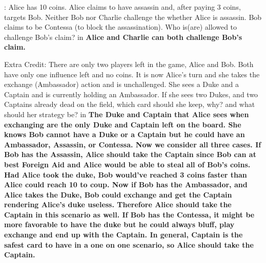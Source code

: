 \documentclass[11.5pt]{article}
\begin{document}
\vskip 0.16in

: Alice has 10 coins. Alice claims to have assassin and, after paying 3 coins, targets Bob. Neither Bob nor Charlie challenge the whether Alice is assassin. Bob claims to be Contessa (to block the assassination). Who is(are) allowed to challenge Bob's claim?
 in
\indent \textbf{Alice and Charlie can both challenge Bob's claim.}

\vskip 0.16in

\newpage

\noindent Extra Credit: There are only two players left in the game, Alice and Bob. Both have only one influence left and no coins. It is now Alice's turn and she takes the exchange (Ambassador) action and is unchallenged. She sees a Duke and a Captain and is currently holding an Ambassador. If she sees two Dukes, and two Captains already dead on the field, which card should she keep, why? and what should her strategy be?
 in
\indent \textbf{The Duke and Captain that Alice sees when exchanging are the only Duke and Captain left on the board. She knows Bob cannot have a Duke or a Captain but he could have an Ambassador, Assassin, or Contessa. Now we consider all three cases. If Bob has the Assassin, Alice should take the Captain since Bob can at best Foreign Aid and Alice would be able to steal all of Bob's coins. Had Alice took the duke, Bob would've reached 3 coins faster than Alice could reach 10 to coup. Now if Bob has the Ambassador, and Alice takes the Duke, Bob could exchange and get the Captain rendering Alice's duke useless. Therefore Alice should take the Captain in this scenario as well. If Bob has the Contessa, it might be more favorable to have the duke but he could always bluff, play exchange and end up with the Captain. In general, Captain is the safest card to have in a one on one scenario, so Alice should take the Captain.}
\end{document}
